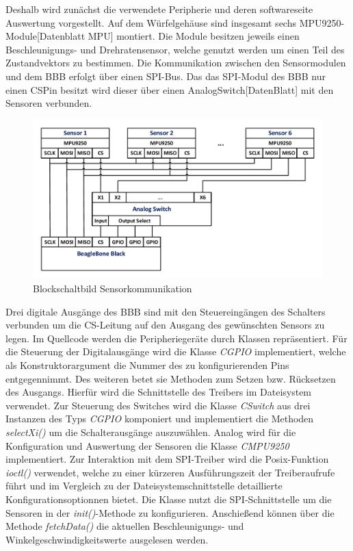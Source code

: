 Deshalb wird zunächst die verwendete Peripherie und deren softwareseite Auswertung vorgestellt. Auf dem Würfelgehäuse sind insgesamt sechs MPU9250-Module[Datenblatt MPU] montiert. Die Module besitzen jeweils einen Beschleunigungs- und Drehratensensor, welche genutzt werden um einen Teil des Zustandvektors zu bestimmen. Die Kommunikation zwischen den Sensormodulen und dem \ac{BBB} erfolgt über einen \ac{SPI}-Bus. Das das \ac{SPI}-Modul des \ac{BBB} nur einen \ac{CS}Pin besitzt wird dieser über einen AnalogSwitch[DatenBlatt] mit den Sensoren verbunden.
\begin{figure}[!h]
\centering
\includegraphics[width=0.7\linewidth]{img/SW_0_Sensoren_BSB.pdf}
\caption{Blockschaltbild Sensorkommunikation}
\end{figure}
Drei digitale Ausgänge des \ac{BBB} sind mit den Steuereingängen des Schalters verbunden um die \ac{CS}-Leitung auf den Ausgang des gewünschten Sensors zu legen.
Im Quellcode werden die Peripheriegeräte durch Klassen repräsentiert. Für die Steuerung der Digitalausgänge wird die Klasse \textit{CGPIO} implementiert, welche als Konstruktorargument die Nummer des zu konfigurierenden Pins entgegennimmt. Des weiteren betet sie Methoden zum Setzen bzw. Rücksetzen des Ausgangs. Hierfür wird die Schnittstelle des Treibers im Dateisystem verwendet. Zur Steuerung des Switches wird die Klasse \textit{CSwitch} aus drei Instanzen des Typs \textit{CGPIO} komponiert und implementiert die Methoden \textit{selectXi()} um die Schalterausgänge auszuwählen.
Analog wird für die Konfiguration und Auswertung der Sensoren die Klasse \textit{CMPU9250} implementiert. Zur Interaktion mit dem \ac{SPI}-Treiber wird die Posix-Funktion \textit{ioctl()} verwendet, welche zu einer kürzeren Ausführungszeit der Treiberaufrufe führt und im Vergleich zu der Dateisystemschnittstelle detaillierte Konfigurationsoptionnen bietet. Die Klasse nutzt die \ac{SPI}-Schnittstelle um die Sensoren in der \textit{init()}-Methode zu konfigurieren. Anschießend können über die Methode \textit{fetchData()} die aktuellen Beschleunigungs- und Winkelgeschwindigkeitswerte ausgelesen werden.

